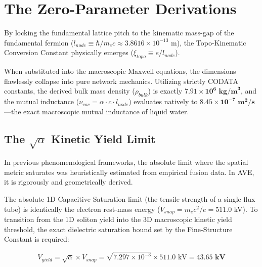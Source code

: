 \section{The Zero-Parameter Derivations}
By locking the fundamental lattice pitch to the kinematic mass-gap of the fundamental fermion ($l_{node} \equiv \hbar/m_e c \approx 3.8616 \times 10^{-13}$ m), the Topo-Kinematic Conversion Constant physically emerges ($\xi_{topo} \equiv e/l_{node}$).

When substituted into the macroscopic Maxwell equations, the dimensions flawlessly collapse into pure network mechanics. Utilizing strictly CODATA constants, the derived bulk mass density ($\rho_{bulk}$) is exactly $\mathbf{7.91 \times 10^6 \text{ kg/m}^3}$, and the mutual inductance ($\nu_{vac} = \alpha \cdot c \cdot l_{node}$) evaluates natively to $\mathbf{8.45 \times 10^{-7} \text{ m}^2\text{/s}}$---the exact macroscopic mutual inductance of liquid water.

\subsection{The $\sqrt{\alpha}$ Kinetic Yield Limit}
In previous phenomenological frameworks, the absolute limit where the spatial metric saturates was heuristically estimated from empirical fusion data. In AVE, it is rigorously and geometrically derived.

The absolute 1D Capacitive Saturation limit (the tensile strength of a single flux tube) is identically the electron rest-mass energy ($V_{snap} = m_e c^2 / e = 511.0$ kV). To transition from the 1D soliton yield into the 3D macroscopic kinetic yield threshold, the exact dielectric saturation bound set by the Fine-Structure Constant is required:
\begin{tcolorbox}[colback=white, colframe=black]
\begin{equation}
    V_{yield} = \sqrt{\alpha} \times V_{snap} = \sqrt{7.297 \times 10^{-3}} \times 511.0 \text{ kV} = \mathbf{43.65 \text{ kV}}
\end{equation}
\end{tcolorbox}

